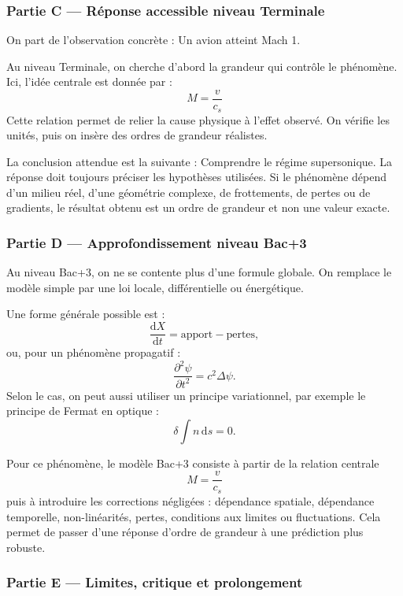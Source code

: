 \documentclass[11pt,a4paper]{article}
\begin{document}
\subsubsection*{Partie C — Réponse accessible niveau Terminale}

\begin{corrigebox}
On part de l'observation concrète : Un avion atteint Mach 1.

Au niveau Terminale, on cherche d'abord la grandeur qui contrôle le phénomène. Ici, l'idée centrale est donnée par :
\[
M=\frac{v}{c_s}
\]
Cette relation permet de relier la cause physique à l'effet observé. On vérifie les unités, puis on insère des ordres de grandeur réalistes.

La conclusion attendue est la suivante : Comprendre le régime supersonique. La réponse doit toujours préciser les hypothèses utilisées. Si le phénomène dépend d'un milieu réel, d'une géométrie complexe, de frottements, de pertes ou de gradients, le résultat obtenu est un ordre de grandeur et non une valeur exacte.
\end{corrigebox}

\subsubsection*{Partie D — Approfondissement niveau Bac+3}

\begin{approfondissementbox}
Au niveau Bac+3, on ne se contente plus d'une formule globale. On remplace le modèle simple par une loi locale, différentielle ou énergétique.

Une forme générale possible est :
\[
\frac{\mathrm d X}{\mathrm dt}=\text{apport}-\text{pertes},
\]
ou, pour un phénomène propagatif :
\[
\frac{\partial^2 \psi}{\partial t^2}=c^2\Delta\psi.
\]
Selon le cas, on peut aussi utiliser un principe variationnel, par exemple le principe de Fermat en optique :
\[
\delta \int n\,\mathrm ds=0.
\]

Pour ce phénomène, le modèle Bac+3 consiste à partir de la relation centrale
\[
M=\frac{v}{c_s}
\]
puis à introduire les corrections négligées : dépendance spatiale, dépendance temporelle, non-linéarités, pertes, conditions aux limites ou fluctuations. Cela permet de passer d'une réponse d'ordre de grandeur à une prédiction plus robuste.
\end{approfondissementbox}

\subsubsection*{Partie E — Limites, critique et prolongement}
\end{document}
